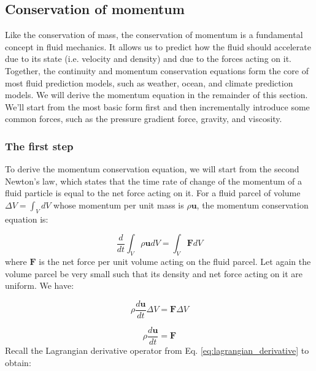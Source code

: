 \documentclass[12pt]{article}
\numberwithin{equation}{section}
\numberwithin{figure}{section}
\numberwithin{table}{section}
\begin{document}
\subsection{Conservation of momentum}

Like the conservation of mass, the conservation of momentum is a fundamental
concept in fluid mechanics.
It allows us to predict how the fluid should accelerate due to its state
(i.e. velocity and density) and due to the forces acting on it.
Together, the continuity and momentum conservation
equations form the core of most fluid prediction models, such as weather, ocean,
and climate prediction models.
We will derive the momentum equation in the remainder of this section.
We'll start from the most basic form first and then incrementally introduce
some common forces, such as the pressure gradient force, gravity, and viscosity.

\subsubsection{The first step}

To derive the momentum conservation equation, we will start from the second
Newton's law, which states that the time rate of change of the momentum of a
fluid particle is equal to the net force acting on it.
For a fluid parcel of volume $\Delta V = \int_V dV$ whose momentum per unit mass
is $\rho \mathbf{u}$, the momentum conservation equation is:

\begin{equation}
  \frac{d}{dt} \int_V \rho \mathbf{u} dV = \int_V \mathbf{F} dV
\end{equation}
where $\mathbf{F}$ is the net force per unit volume acting on the fluid parcel.
Let again the volume parcel be very small such that its density and net force
acting on it are uniform. We have:

\begin{equation}
  \rho \frac{d\mathbf{u}}{dt} \Delta V = \mathbf{F} \Delta V
\end{equation}

\begin{equation}
  \rho \frac{d\mathbf{u}}{dt} = \mathbf{F}
\end{equation}
Recall the Lagrangian derivative operator from Eq. \ref{eq:lagrangian_derivative}
to obtain:
\end{document}
